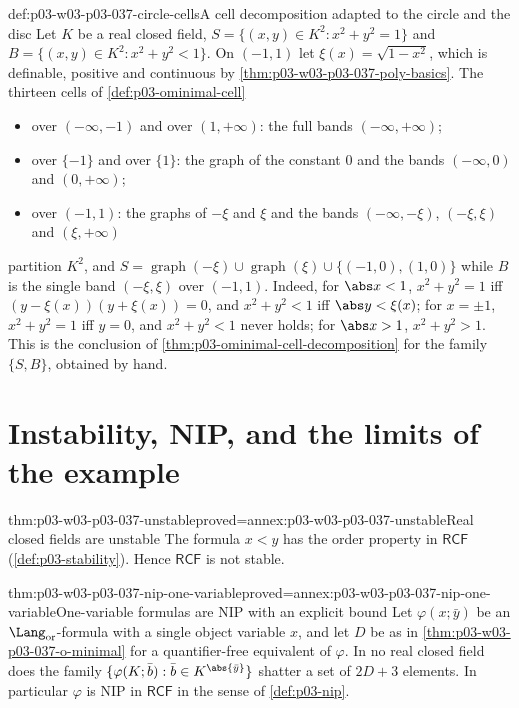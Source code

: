 \begin{hbexample}{def:p03-w03-p03-037-circle-cells}{A cell decomposition adapted to the circle and the disc}
Let \(K\) be a real closed field,
\(S=\{(x,y)\in K^2:x^2+y^2=1\}\) and \(B=\{(x,y)\in K^2:x^2+y^2<1\}\).  On
\((-1,1)\) let \(\xi(x)=\sqrt{1-x^2}\), which is definable, positive and
continuous by \cref{thm:p03-w03-p03-037-poly-basics}.  The thirteen cells of
\cref{def:p03-ominimal-cell}
\begin{itemize}
\item over \((-\infty,-1)\) and over \((1,+\infty)\): the full bands
  \((-\infty,+\infty)\);
\item over \(\{-1\}\) and over \(\{1\}\): the graph of the constant \(0\) and
  the bands \((-\infty,0)\) and \((0,+\infty)\);
\item over \((-1,1)\): the graphs of \(-\xi\) and \(\xi\) and the bands
  \((-\infty,-\xi)\), \((-\xi,\xi)\) and \((\xi,+\infty)\)
\end{itemize}
partition \(K^2\), and
\(S=\operatorname{graph}(-\xi)\cup\operatorname{graph}(\xi)\cup
\{(-1,0),(1,0)\}\) while \(B\) is the single band \((-\xi,\xi)\) over
\((-1,1)\).  Indeed, for \(\abs x<1\), \(x^2+y^2=1\) iff
\((y-\xi(x))(y+\xi(x))=0\), and \(x^2+y^2<1\) iff \(\abs y<\xi(x)\); for
\(x=\pm1\), \(x^2+y^2=1\) iff \(y=0\), and \(x^2+y^2<1\) never holds; for
\(\abs x>1\), \(x^2+y^2>1\).  This is the conclusion of
\cref{thm:p03-ominimal-cell-decomposition} for the family \(\{S,B\}\),
obtained by hand.
\end{hbexample}

\section{Instability, NIP, and the limits of the example}
\label{sec:p03-w03-p03-037-nip}

\begin{hbtheorem}{thm:p03-w03-p03-037-unstable}{proved=annex:p03-w03-p03-037-unstable}{Real closed fields are unstable}
The formula \(x<y\) has the order property in \(\mathsf{RCF}\)
(\cref{def:p03-stability}).  Hence \(\mathsf{RCF}\) is not stable.
\end{hbtheorem}

\begin{hbtheorem}{thm:p03-w03-p03-037-nip-one-variable}{proved=annex:p03-w03-p03-037-nip-one-variable}{One-variable formulas are NIP with an explicit bound}
Let \(\varphi(x;\bar y)\) be an \(\Lang_{\mathrm{or}}\)-formula with a single
object variable \(x\), and let \(D\) be as in
\cref{thm:p03-w03-p03-037-o-minimal} for a quantifier-free equivalent of
\(\varphi\).  In no real closed field does the family
\(\{\varphi(K;\bar b):\bar b\in K^{\abs{\bar y}}\}\) shatter a set of
\(2D+3\) elements.  In particular \(\varphi\) is NIP in \(\mathsf{RCF}\) in
the sense of \cref{def:p03-nip}.
\end{hbtheorem}

